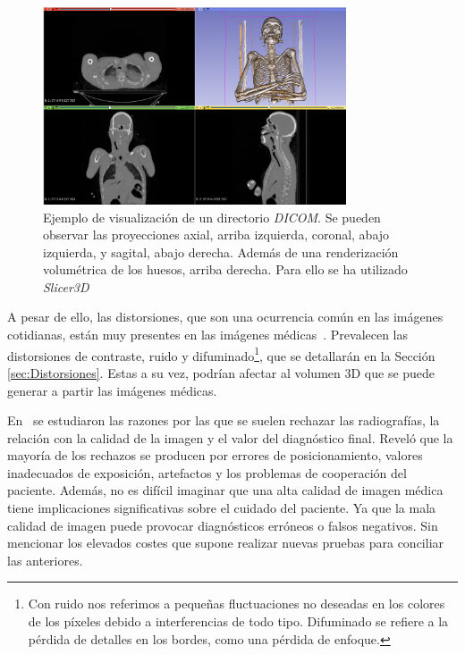 \begin{figure}[htp]
  \begin{center}
    \includegraphics[width=0.8\textwidth]{imagenes/chapter1/SlicerVisualization}
  \end{center}
  \caption[Ejemplo de visualización de un directorio DICOM.]{Ejemplo de visualización de un directorio \emph{DICOM}. Se pueden observar
  las proyecciones axial, arriba izquierda, coronal, abajo izquierda, 
  y sagital, abajo derecha. Además de una renderización volumétrica
  de los huesos, arriba derecha. Para ello se ha utilizado \emph{Slicer3D}~\cite{Slicer3D}}
  \label{fig:SlicerVisualization}
\end{figure}

A pesar de ello, las distorsiones, que son una ocurrencia común en las imágenes cotidianas, 
están muy presentes en las imágenes médicas~\cite{MedicalImpactOfDistortions}.
Prevalecen las distorsiones de contraste, ruido y difuminado\footnote{
  Con ruido nos referimos a pequeñas fluctuaciones no deseadas en los colores de 
  los píxeles debido a interferencias de todo tipo. Difuminado se refiere a la 
  pérdida de detalles en los bordes, como una pérdida de enfoque.
}, 
que se detallarán en la Sección \ref{sec:Distorsiones}.
Estas a su vez, podrían afectar al volumen 3D que se puede generar a partir 
las imágenes médicas. 
 
En~\cite{XrayRejectionFactor} se estudiaron las razones por las que se suelen 
rechazar las radiografías, la relación con la calidad de la imagen y el valor
del diagnóstico final. Reveló que la mayoría de los rechazos se producen por 
errores de posicionamiento, valores inadecuados de exposición, artefactos 
y los problemas de cooperación del paciente. 
Además, no es difícil imaginar que una alta 
calidad de imagen médica tiene implicaciones significativas sobre el cuidado
del paciente. Ya que la mala calidad de imagen puede provocar diagnósticos erróneos 
o falsos negativos. Sin mencionar los elevados costes que supone realizar 
nuevas pruebas para conciliar las anteriores.
 

